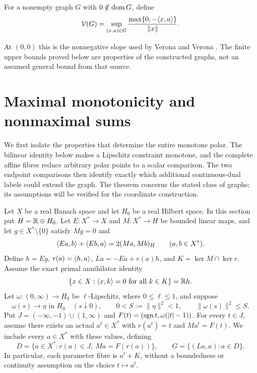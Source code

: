 \begin{definition}
For a nonempty graph $G$ with $0\notin\operatorname{dom} G$, define
\begin{equation}
\mathcal V(G)=\sup_{(x,a)\in G}
 \frac{\max\{0,-\langle x,a\rangle\}}{\|x\|}.
\label{eq:D3}
\end{equation}
\end{definition}
At $(0,0)$ this is the nonnegative slope used by Verona and Verona
\cite{verona2008}. The finite upper bounds proved below are properties
of the constructed graphs, not an assumed general bound from that source.

\section{Maximal monotonicity and nonmaximal sums}
\label{sec:endpoint-criterion}
We first isolate the properties that determine the entire monotone polar.
The bilinear identity below makes a Lipschitz constraint monotone, and
the complete affine fibres reduce arbitrary polar points to a scalar
comparison. The two endpoint comparisons then identify exactly which
additional continuous-dual labels could extend the graph. The theorem
concerns the stated class of graphs; its assumptions will be verified
for the coordinate construction.

Let $X$ be a real Banach space and let $H_0$ be a real Hilbert space.
In this section put $H=\mathbb R\oplus H_0$. Let
$E:X^*\to X$ and $M:X^*\to H$ be bounded linear maps, and let
$g\in X^*\setminus\{0\}$ satisfy $Mg=0$ and
\begin{equation}
\langle Ea,b\rangle+\langle Eb,a\rangle=2(Ma,Mb)_H
\qquad(a,b\in X^*).
\label{eq:abs-bilinear}
\end{equation}
Define $h=Eg$, $r(a)=\langle h,a\rangle$, $La=-Ea+r(a)h$, and
$K=\ker M\cap\ker r$. Assume the exact primal annihilator identity
\begin{equation}
\{x\in X:\langle x,k\rangle=0\ \hbox{for all }k\in K\}=\mathbb R h.
\label{eq:abs-annihilator}
\end{equation}
Let $\omega:(0,\infty)\to H_0$ be $\ell$-Lipschitz, where
$0\le\ell\le1$, and suppose
\begin{equation}
\omega(s)\longrightarrow\eta\text{ in }H_0\quad(s\downarrow0),
\qquad 0<S:=\|\eta\|^2<1,\qquad \|\omega(s)\|^2\le S.
\label{eq:abs-tail}
\end{equation}
Put $J=(-\infty,-1)\cup(1,\infty)$ and
$F(t)=(\operatorname{sgn} t,\omega(|t|-1))$. For every $t\in J$, assume
there exists an actual $a^t\in X^*$ with $r(a^t)=t$ and
$Ma^t=F(t)$. We include every $a\in X^*$ with these values, defining
\begin{equation}
D=\{a\in X^*:r(a)\in J,\ Ma=F(r(a))\},\qquad
G=\{(La,a):a\in D\}.
\label{eq:abs-full-graph}
\end{equation}
In particular, each parameter fibre is $a^t+K$, without a boundedness
or continuity assumption on the choice $t\mapsto a^t$.

